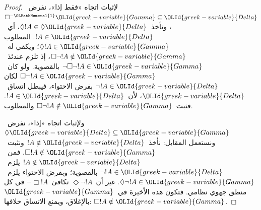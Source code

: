 \documentclass[../../../include/open-logic-section]{subfiles}
\begin{document}
\begin{proof}
  لإثبات اتجاه «فقط إذا»، نفرض~$\Box^{-{\OLMathNumeral{1}}}{\OLId{greek-variable}{Gamma}} \subseteq {\OLId{greek-variable}{Delta}}$،
  ونأخذ~$\Diamond!A \in \Diamond{\OLId{greek-variable}{Delta}}$، أي~$!A \in {\OLId{greek-variable}{Delta}}$.
  المطلوب $\Diamond!A \in {\OLId{greek-variable}{Gamma}}$؛ ويكفي له~$\Box\lnot!A \notin {\OLId{greek-variable}{Gamma}}$،
  إذ تلزم عندئذ~$\lnot\Box\lnot !A \in {\OLId{greek-variable}{Gamma}}$ بالقصوية.
  ولو كان~$\Box\lnot!A \in {\OLId{greek-variable}{Gamma}}$ لكان
  $\lnot!A \in {\OLId{greek-variable}{Delta}}$ بفرض الاحتواء، فيبطل اتساق~${\OLId{greek-variable}{Delta}}$،
  لأن~$!A \in {\OLId{greek-variable}{Delta}}$. فثبت~$\Box\lnot!A \notin {\OLId{greek-variable}{Gamma}}$ والمطلوب.

  ولإثبات اتجاه «إذا»، نفرض~$\Diamond{\OLId{greek-variable}{Delta}} \subseteq {\OLId{greek-variable}{Gamma}}$
  ونستعمل المقابل: نأخذ~$!A \notin {\OLId{greek-variable}{Delta}}$ ونثبت~$\Box!A \notin {\OLId{greek-variable}{Gamma}}$.
  فمن~$!A \notin {\OLId{greek-variable}{Delta}}$ يلزم~$\lnot!A \in {\OLId{greek-variable}{Delta}}$ بالقصوية؛
  وبفرض الاحتواء يلزم~$\Diamond\lnot!A \in {\OLId{greek-variable}{Gamma}}$.
  غير أن~$\Diamond\lnot!A$ تكافئ~$\lnot\Box !A$ في كل منطق جهوي نظامي.
  فتكون هذه الأخيرة في~${\OLId{greek-variable}{Gamma}}$ بالإغلاق، ويمنع الاتساق خلافها:
  $\Box!A \notin{\OLId{greek-variable}{Gamma}}$.
\end{proof}
\end{document}
